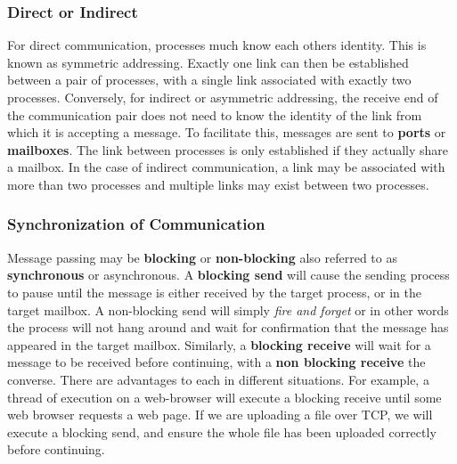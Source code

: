 \documentclass[10pt,a4paper]{article}
\begin{document}
\subsubsection{Direct or Indirect}
For direct communication, processes much know each others identity. This is known as symmetric addressing.  Exactly one link can then be established between a pair of processes, with a single link associated with exactly two processes. Conversely, for indirect or asymmetric addressing, the receive end of the communication pair does not need to know the identity of the link from which it is accepting a message. To facilitate this, messages are sent to {\bf ports} or {\bf mailboxes}. The link between processes is only established if they actually share a mailbox. In the case of indirect communication, a link may be associated with more than two processes and multiple links may exist between two processes.
\subsubsection{Synchronization of Communication} 
Message passing may be {\bf blocking} or {\bf non-blocking} also referred to as {\bf synchronous} or asynchronous. A {\bf blocking send} will cause the sending process to pause until the message is either received by the target process, or in the target mailbox. A non-blocking send will simply {\it fire and forget} or in other words the process will not hang around and wait for confirmation that the message has appeared in the target mailbox. Similarly, a {\bf blocking receive} will wait for a message to be received  before continuing, with a {\bf non blocking receive} the converse. There are advantages to each in different situations. For example, a thread of execution on a web-browser will execute a blocking receive until some web browser requests a web page. If we are uploading a file over TCP, we will execute a blocking send, and ensure the whole file has been uploaded correctly before continuing. 
\end{document}
